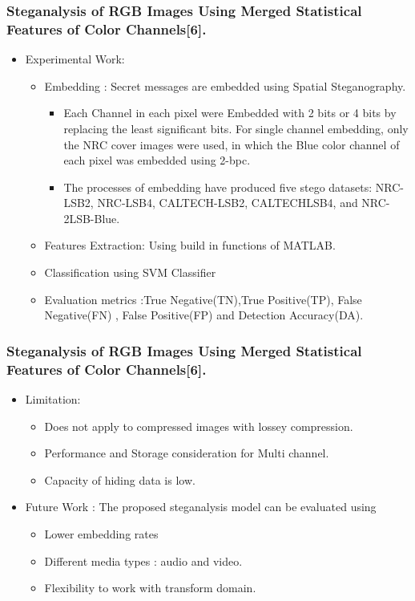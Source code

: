 \documentclass{beamer} %
\theoremstyle{definition} %
\begin{document}
\begin{frame}
\frametitle{Steganalysis of RGB Images Using Merged Statistical Features of Color Channels[6].}
\begin{itemize}
\item Experimental Work:
 \begin{itemize}
 	 	\item Embedding : Secret messages are embedded using Spatial Steganography.
 	\begin{itemize}
 	\item Each Channel in each pixel were Embedded with 2 bits or 4 bits by replacing the least significant bits. For single channel embedding, only the NRC cover images were used, in which the Blue color channel of each pixel was embedded using 2-bpc.
 	\item  The processes of embedding have produced five stego datasets: NRC-LSB2, NRC-LSB4, CALTECH-LSB2, CALTECHLSB4, and NRC-2LSB-Blue. 
 \end{itemize}
      \item Features Extraction: Using build in functions of MATLAB.
      \item Classification using SVM Classifier
      \item Evaluation metrics :True Negative(TN),True Positive(TP), False Negative(FN) , False Positive(FP) and Detection Accuracy(DA). 
\end{itemize}
\end{itemize}
\end{frame}

\begin{frame}
\frametitle{Steganalysis of RGB Images Using Merged Statistical Features of Color Channels[6].}
\begin{itemize}
\item Limitation: 
 \begin{itemize}
 	\item Does not apply to compressed images with lossey compression.
 	\item Performance and Storage consideration for Multi channel.
 	\item Capacity of hiding data is low.
 \end{itemize}
 \item Future Work : The proposed steganalysis model can be evaluated using 
 \begin{itemize}
 	\item Lower embedding rates 
 	\item Different media types : audio and video.
 	\item Flexibility to work with transform domain.
 \end{itemize}
 \end{itemize}
\end{frame}
\end{document}
